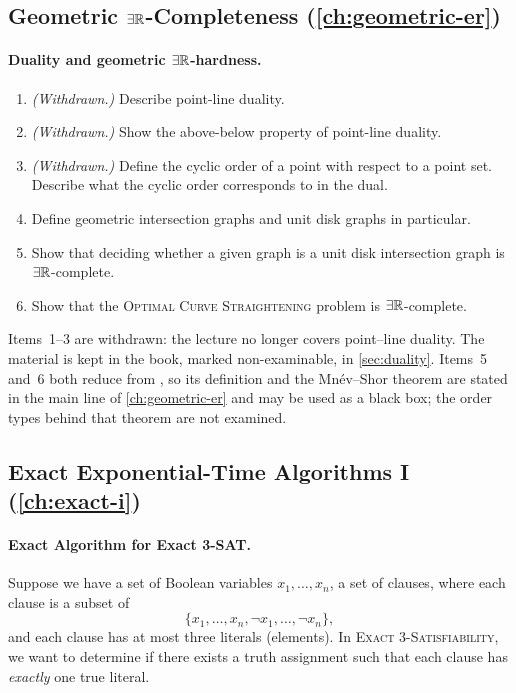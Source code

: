 \subsection*{Geometric $\exists\mathbb{R}$-Completeness (\cref{ch:geometric-er})}

\paragraph{Duality and geometric $\exists\mathbb{R}$-hardness.}
\begin{enumerate}
  \item \emph{(Withdrawn.)} Describe point-line duality.
  \item \emph{(Withdrawn.)} Show the above-below property of point-line duality.
  \item \emph{(Withdrawn.)} Define the cyclic order of a point with respect to a
        point set. Describe what the cyclic order corresponds to in the dual.
  \item Define geometric intersection graphs and unit disk graphs in particular.
  \item Show that deciding whether a given graph is a unit disk intersection
        graph is $\exists\mathbb{R}$-complete.
  \item Show that the \textsc{Optimal Curve Straightening} problem is
        $\exists\mathbb{R}$-complete.
\end{enumerate}

\begin{remark}
Items~1--3 are withdrawn: the lecture no longer covers point--line duality. The
material is kept in the book, marked non-examinable, in \cref{sec:duality}.
Items~5 and~6 both reduce from , so its definition and the
Mn\'ev--Shor theorem are stated in the main line of \cref{ch:geometric-er} and
may be used as a black box; the order types behind that theorem are not
examined.
\end{remark}

\subsection*{Exact Exponential-Time Algorithms I (\cref{ch:exact-i})}

\paragraph{Exact Algorithm for Exact 3-SAT.}
Suppose we have a set of Boolean variables $x_1, \ldots, x_n$, a set of clauses,
where each clause is a subset of
\[ \{x_1, \ldots, x_n, \lnot x_1, \ldots, \lnot x_n\}, \]
and each clause has at most three literals (elements). In \textsc{Exact 3-Satisfiability}, we want to
determine if there exists a truth assignment such that each clause has
\emph{exactly} one true literal.

